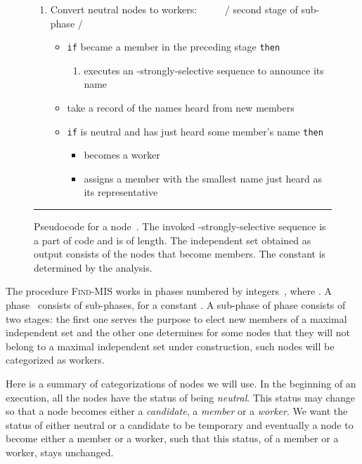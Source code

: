 \documentclass[11pt]{article}
\newcommand{\FF}{\vspace*{\medskipamount}}
\begin{document}
\begin{figure}[t]
\begin{enumerate}[nosep,leftmargin=*]
\begin{enumerate}[nosep,leftmargin=*]
\begin{enumerate}[nosep]
\item
Convert neutral nodes to workers:
~ ~ ~ / second stage of sub-phase  /
\begin{itemize}[nosep]
\item[]
\texttt{if}  became a member in the preceding stage \texttt{then} 
\begin{enumerate}[nosep]
\item[]
 executes  an -strongly-selective sequence to announce its name 
\end{enumerate}
\item[]
take a record of the names  heard  from new members
\item[]
\texttt{if}  is neutral and  has just heard some member's name \texttt{then}
\begin{itemize}[nosep]
\item[]
 becomes a worker
\item[]
 assigns a member with the smallest name just heard as its representative
\end{itemize}
\end{itemize}
\end{enumerate}
\end{enumerate}
\end{enumerate}

\FF

\hrule

\caption{\label{proc:Find-MIS}
Pseudocode for a node~.
The invoked -strongly-selective sequence is a part of code and is of  length.
The independent set obtained as output  consists of the nodes that become members.
The constant  is determined by the analysis.}
\end{figure}


The procedure \textsc{Find-MIS} works in phases numbered by integers~, where .
A phase~ consists of  sub-phases, for a constant .
A sub-phase  of phase  consists of two stages: the first one serves the purpose to elect new members of a maximal independent set and the other one determines for some nodes that they will not belong to a maximal independent set under construction, such nodes will be categorized as workers.

Here is a summary of categorizations of nodes we will use.
In the beginning of an execution, all the nodes have the status of being \emph{neutral}.
This status may change so that a node becomes either a \emph{candidate}, a \emph{member} or a \emph{worker}.
We want the status of either neutral or a candidate to be temporary and  eventually a node to become either a member or a worker, such that this status, of a member or a worker, stays unchanged.
\end{document}
